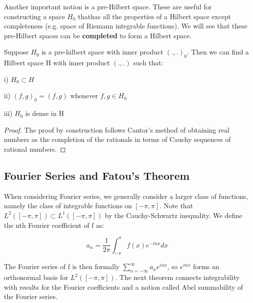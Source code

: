 \documentclass[class=article, crop=false]{standalone}
\begin{document}
			Another important notion is a pre-Hilbert space. These are useful for constructing a space $H_0$ thathas all the properties of a Hilbert space except completeness (e.g. space of Riemann integrable functions). We will see that these pre-Hilbert spaces can be \textbf{completed} to form a Hilbert space.

			\begin{proposition} 
				Suppose $H_0$ is a pre-hilbert space with inner product $(.,.)_0$. Then we can find a Hilbert space H with inner product $(.,.)$ such that:

				i) $H_0 \subset H$

				ii) $(f, g)_0 = (f, g)$ whenever $f, g \in H_0$

				iii) $H_0$ is dense in H
			\end{proposition}
			\begin{proof}
				The proof by construction follows Cantor's method of obtaining real numbers as the completion of the rationals in terms of Cauchy sequences of rational numbers.
			\end{proof}

	\subsection{Fourier Series and Fatou's Theorem}
		When considering Fourier series, we generally consider a larger class of functions, namely the class of integrable functions on $[-\pi, \pi]$. Note that $L^2([-\pi, \pi]) \subset L^1([-\pi, \pi])$ by the Cauchy-Schwartz inequality. We define the nth Fourier coefficient of f as:

			$$a_n = \frac{1}{2\pi} \int_{-\pi}^\pi f(x) e^{-inx} dx$$

		The Fourier series of f is then formally $\sum_{n=-\infty}^\infty a_n e^{inx}$, so $e^{inx}$ forms an orthonormal basis for $L^2([-\pi, \pi])$. The next theorem connects integrability with results for the Fourier coefficients and a notion called Abel summability of the Fourier series.
\end{document}
